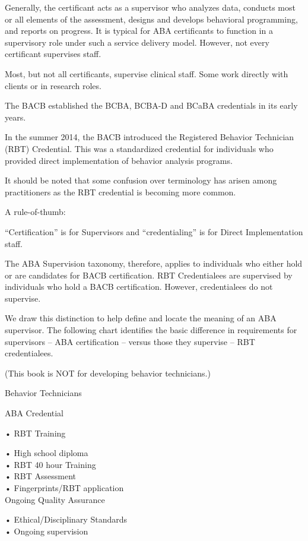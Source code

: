 Generally, the certificant acts as a supervisor who analyzes data, conducts most or all elements of the assessment, designs and develops behavioral programming, and reports on progress. It is typical for ABA certificants to function in a supervisory role under such a service delivery model. However, not every certificant supervises staff.

Most, but not all certificants, supervise clinical staff. Some work directly with clients or in research roles.

The BACB\textregistered{} established the BCBA, BCBA-D and BCaBA credentials in its early years. 

In the summer 2014, the BACB\textregistered{} introduced the Registered Behavior Technician (RBT) Credential. This was a standardized credential for individuals who provided direct implementation of behavior analysis programs. 

It should be noted that some confusion over terminology has arisen among practitioners as the RBT credential is becoming more common. 

A rule-of-thumb:

``Certification'' is for Supervisors and ``credentialing'' is for Direct Implementation staff.

The ABA Supervision taxonomy, therefore, applies to individuals who either hold or are candidates for BACB\textregistered{} certification. RBT Credentialees are supervised by individuals who hold a BACB\textregistered{} certification. However, credentialees do not supervise.

We draw this distinction to help define and locate the meaning of an ABA supervisor. The following chart identifies the basic difference in requirements for supervisors – ABA certification – versus those they supervise – RBT credentialees.

(This book is NOT for developing behavior technicians.)

Behavior Technicians 


ABA Credential

    • RBT 
%
%
%
Training

    • High school diploma\\
    • RBT 40 hour Training\\
    • RBT Assessment\\
    • Fingerprints/RBT application\\


Ongoing Quality Assurance

    • Ethical/Disciplinary Standards\\
    • Ongoing supervision\\

